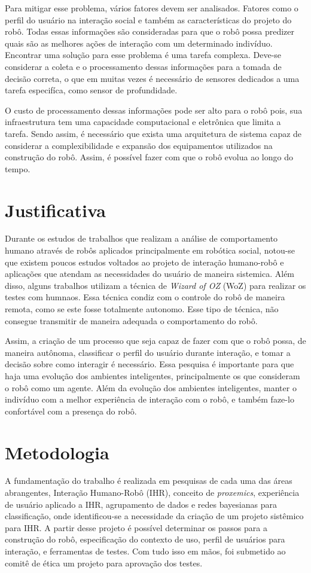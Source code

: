 Para mitigar esse problema, vários fatores devem ser analisados. Fatores como o perfil do usuário na interação social e também as características do projeto do robô. Todas essas informações são consideradas para que o robô possa predizer quais são as melhores ações de interação com um determinado indivíduo. Encontrar uma solução  para esse problema é uma tarefa complexa. Deve-se considerar a coleta e o processamento dessas informações para a tomada de decisão correta, o que em muitas vezes é necessário de sensores dedicados a uma tarefa especifíca, como sensor de profundidade.

O custo de processamento dessas informações pode ser alto para o robô pois, sua infraestrutura tem uma capacidade computacional e eletrônica que limita a tarefa. Sendo assim, é necessário que exista uma arquitetura de sistema capaz de considerar a complexibilidade e expansão dos equipamentos utilizados na construção do robô. Assim, é possível fazer com que o robô evolua ao longo do tempo.

\section{Justificativa}
Durante os estudos de trabalhos que realizam a análise de comportamento humano através de robôs aplicados principalmente em robótica social, notou-se que existem poucos estudos voltados ao projeto de interação humano-robô e aplicações que atendam as necessidades do usuário de maneira sistemica. Além disso, alguns trabalhos utilizam a técnica de \emph{Wizard of OZ} (WoZ) para realizar os testes com humnaos. Essa técnica condiz com o controle do robô de maneira remota, como se este fosse totalmente autonomo. Esse tipo de técnica, não consegue transmitir de maneira adequada o comportamento do robô.

Assim, a criação de um processo que seja capaz de fazer com que o robô possa, de maneira autônoma, classificar o perfil do usuário durante interação, e tomar a decisão sobre como interagir é necessário. Essa pesquisa é importante para que haja uma evolução dos ambientes inteligentes, principalmente os que consideram o robô como um agente. Além da evolução dos ambientes inteligentes, manter o indivíduo com a melhor experiência de interação com o robô, e também faze-lo confortável com a presença do robô.

\section{Metodologia}
A fundamentação do trabalho é realizada em pesquisas de cada uma das áreas abrangentes, Interação Humano-Robô (IHR), conceito de \emph{proxemics}, experiência de usuário aplicado a IHR, agrupamento de dados e redes bayesianas para classificação, onde identificou-se a necessidade da criação de um projeto sistêmico para IHR. A partir desse projeto é possível determinar os passos para a construção do robô, especificação do contexto de uso, perfil de usuários para interação, e ferramentas de testes. Com tudo isso em mãos, foi submetido ao comitê de ética um projeto para aprovação dos testes.


